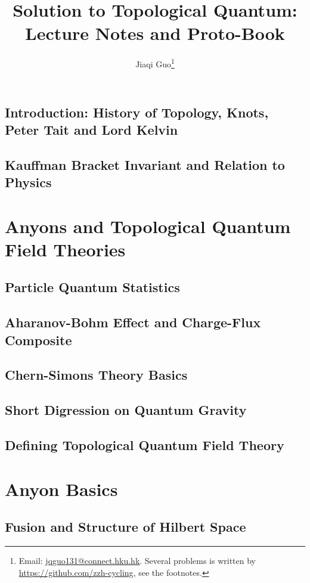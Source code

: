 \documentclass{book}
\title{Solution to Topological Quantum: Lecture Notes and Proto-Book}
\author{Jiaqi Guo\footnote{Email: \href{mailto:jqguo131@connect.hku.hk}{jqguo131@connect.hku.hk}. Several problems is written by \url{https://github.com/zzh-cycling}, see the footnotes.}}
\begin{document}
\maketitle
\tableofcontents

\chapter{Introduction: History of Topology, Knots, Peter Tait and Lord Kelvin}

\chapter{Kauffman Bracket Invariant and Relation to Physics}


\part{Anyons and Topological Quantum Field Theories}

\chapter{Particle Quantum Statistics}


\chapter{Aharanov-Bohm Effect and Charge-Flux Composite}
    

\chapter{Chern-Simons Theory Basics}


\chapter{Short Digression on Quantum Gravity}
\chapter{Defining Topological Quantum Field Theory}

\part{Anyon Basics}

\chapter{Fusion and Structure of Hilbert Space}

\end{document}
